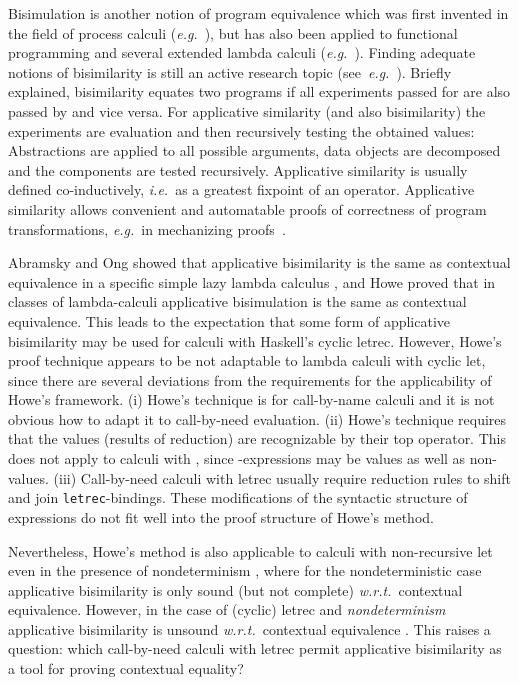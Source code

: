 \documentclass{LMCS}
\theoremstyle{plain}
\theoremstyle{definition}
\newcommand{\eg}{{\em e.g.}}
\newcommand{\ie}{{\em i.e.}}
\newcommand{\wrt}{{\em w.r.t.}}
\newcommand{\tletrec}{{\tt letrec}}
\begin{document}
Bisimulation is another notion of program equivalence which was first invented
in the field of process calculi 
(\eg\ \cite{Milner:80,milner-pi-calc:99,sangiorgi-walker:01}), but has also 
been applied to functional programming and several extended lambda calculi 
(\eg\ \cite{howe:89,abramsky-lazy:90,howe:96}).
Finding adequate notions of bisimilarity is still an active research topic 
(see~\eg\ \cite{koutavas-wand:2006,Sangiorgi-Kobayashi-Sumii:2011}).
Briefly explained, bisimilarity equates two programs  if all 
experiments passed for  are also passed by  and vice versa. For 
applicative similarity (and also bisimilarity) the experiments are evaluation
and then recursively testing the obtained values: 
Abstractions are applied to all possible arguments, data objects are decomposed
and the components are tested recursively.
Applicative similarity is usually defined co-inductively, \ie\ as a greatest
fixpoint of an operator. 
Applicative similarity allows convenient and automatable proofs of correctness
of program transformations, \eg\ in mechanizing 
proofs~\cite{Dennis-Bundy-Green:1997}.

Abramsky and Ong showed that applicative bisimilarity is the same as contextual
equivalence in a specific simple lazy lambda calculus  
\cite{abramsky-lazy:90,abramsky-ong:93}, and Howe \cite{howe:89,howe:96} proved
that in classes of lambda-calculi applicative bisimulation is the same as 
contextual equivalence. 
This leads to the expectation that some form of applicative bisimilarity may be
used for calculi with  Haskell's cyclic letrec. 
However, Howe's proof technique appears to be not adaptable to lambda calculi
with cyclic let, since there are several deviations from the requirements for
the applicability of Howe's framework.
(i) Howe's technique is for call-by-name calculi and it is not obvious how to
adapt it to call-by-need evaluation. 
(ii) Howe's technique requires that the values (results of reduction) are 
recognizable by their top operator. 
This does not apply to calculi with , since -expressions
may be values as well as non-values. 
(iii) Call-by-need calculi with letrec usually require reduction rules to shift
and join \tletrec-bindings. These modifications of the syntactic structure of
expressions do not fit well into the proof structure of Howe's method.

Nevertheless, Howe's method is also applicable to calculi with non-recursive 
let even in the presence of nondeterminism \cite{mannmss:10}, where for the
nondeterministic case applicative bisimilarity is only sound (but not complete)
\wrt\ contextual equivalence.
However, in the case of (cyclic) letrec and {\em nondeterminism} applicative
bisimilarity is unsound \wrt\ contextual equivalence
\cite{schmidt-schauss-sabel-machkasova-IPL:11}.
This raises a question: 
which call-by-need calculi with letrec permit applicative bisimilarity as a 
tool for proving contextual equality?
 
\end{document}
